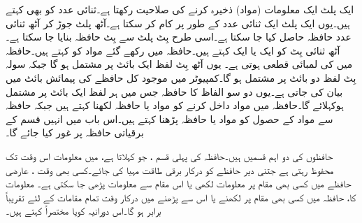 ایک پلٹ ایک معلومات (مواد)  ذخیرہ کرنے کی صلاحیت رکھتا ہے۔ثنائی عدد کو   بھی  کہتے ہیں۔یوں ایک پلٹ ایک ثنائی عدد   کے طور  پر کام کر سکتا ہے۔آٹھ پلٹ جوڑ کر آٹھ ثنائی عدد حافظہ حاصل کیا جا سکتا ہے۔اسی طرح    بِٹ پلٹ سے     بِٹ حافظہ بنایا جا سکتا ہے۔آٹھ ثنائی  بِٹ کو ایک  یا ایک  کہتے ہیں۔حافظہ میں رکھے  گئے   مواد کو کہتے ہیں۔حافظہ میں  کی لمبائی قطعی ہوتی ہے۔ یوں آٹھ بِٹ لفظ ایک بائٹ پر مشتمل ہو گا جبکہ سولہ بِٹ لفظ دو بائٹ پر مشتمل ہو گا۔کمپیوٹر میں موجود کل  حافظے  کی  پیمائش  بائٹ میں بیان کی جاتی ہے۔یوں  دو سو الفاظ کا حافظہ  جس میں ہر لفظ ایک بائٹ پر مشتمل ہوکہلائے گا۔حافظہ میں مواد داخل کرنے کو مواد یا حافظہ لکھنا کہتے ہیں جبکہ  حافظہ  سے مواد کے حصول کو مواد   یا   حافظہ پڑھنا کہتے ہیں۔اس باب میں انہیں قسم کے  برقیاتی  حافظہ پر غور کیا جائے گا۔


حافظوں کی دو اہم  قسمیں ہیں۔حافظہ کی پہلی قسم ، جو  کہلاتا ہے، میں معلومات اس وقت تک محفوظ رہتی ہے جتنی دیر حافظے کو درکار برقی طاقت مہیا کی جائے۔کسی بھی وقت   ،  عارضی حافظے میں کسی بھی   مقام پر  معلومات   لکھی  یا اس مقام سے  معلومات پڑھی جا سکتی ہے۔ معلومات کا، حافظہ میں کسی بھی مقام پر لکھنے یا اس سے پڑھنے میں درکار وقت تمام  مقامات کے لئے تقریباً برابر ہو گا۔اس دورانیہ کویا  مختصراً   کہتے ہیں۔


